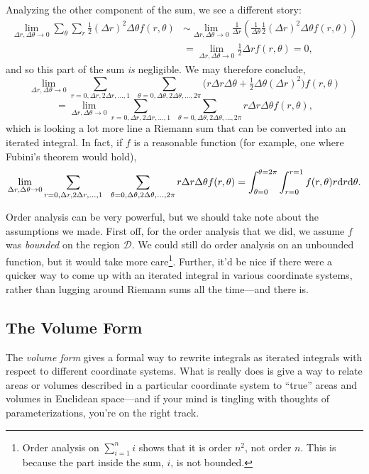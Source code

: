 Analyzing the other component of the sum, we see a different story:
\begin{align*}
	\lim_{\Delta r,\Delta\theta\to 0}
	\sum_{\theta}\sum_{r} \tfrac{1}{2}(\Delta r)^2\Delta \theta f(r,\theta)
	&\sim
	\lim_{\Delta r,\Delta\theta\to 0}
	\frac{1}{\Delta r}\left(\frac{1}{\Delta \theta} \tfrac{1}{2}(\Delta r)^2\Delta\theta f(r,\theta)\right)\\
	&=\lim_{\Delta r,\Delta\theta \to 0}\tfrac{1}{2}\Delta rf(r,\theta) = 0,
\end{align*}
and so this part of the sum \emph{is} negligible.  We may therefore conclude,
\[
	\lim_{\Delta r,\Delta \theta\to 0}
	\sum_{r=0,\Delta r,2\Delta r,\ldots,1}\ \ \sum_{\theta=0,\Delta\theta,
	2\Delta\theta, \ldots, 2\pi} \Big(
		r\Delta r\Delta \theta + \tfrac{1}{2}\Delta\theta(\Delta r)^2
	\Big)f(r,\theta)
\]
\[
	=\lim_{\Delta r,\Delta \theta\to 0}
	\sum_{r=0,\Delta r,2\Delta r,\ldots,1}\ \ \sum_{\theta=0,\Delta\theta,
	2\Delta\theta, \ldots, 2\pi} 
		r\Delta r\Delta \theta f(r,\theta),
\]
which is looking a lot more line a Riemann sum that can be converted into an iterated integral.
In fact, if $f$ is a reasonable function (for example, one where Fubini's theorem would hold),
\[
	\lim_{\Delta r,\Delta \theta\to 0}
	\sum_{r=0,\Delta r,2\Delta r,\ldots,1}\ \ \sum_{\theta=0,\Delta\theta,
	2\Delta\theta, \ldots, 2\pi} 
		r\Delta r\Delta \theta f(r,\theta)
		=\int_{\theta=0}^{\theta=2\pi}\int_{r=0}^{r=1}f(r,\theta)r\d r\d \theta.
\]

Order analysis can be very powerful, but we should take note about the assumptions we made.
First off, for the order analysis that we did, we assume $f$ was \emph{bounded} on the region
$\mathcal D$.  We could still do order analysis on an unbounded function, but it would take more 
care\footnote{
	Order analysis on $\sum_{i=1}^n i$ shows that it is order $n^2$, not order $n$.
	This is because the part inside the sum, $i$, is not bounded.
}.  Further, it'd be nice if there were a quicker way to come up with an iterated
integral in various coordinate systems, rather than lugging around Riemann sums
all the time---and there is.

\subsection{The Volume Form}

The \emph{volume form} gives a formal way to rewrite integrals as iterated integrals
with respect to different coordinate systems.  What is really does is give a way
to relate areas or volumes described in a particular coordinate system to ``true''
areas and volumes in Euclidean space---and if your mind is tingling with thoughts
of parameterizations, you're on the right track.



